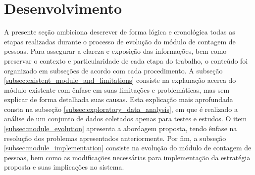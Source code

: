 \section{Desenvolvimento}
\label{sec:metodologia}

A presente seção ambiciona descrever de forma lógica e cronológica todas as etapas realizadas durante o processo de evolução do módulo de contagem de pessoas. Para assegurar a clareza e exposição das informações, bem como preservar o contexto e particularidade de cada etapa do trabalho, o conteúdo foi organizado em subseções de acordo com cada procedimento. A subseção \ref{subsec:existent_module_and_limitations} consiste na explanação acerca do módulo existente com ênfase em suas limitações e problemáticas, mas sem explicar de forma detalhada suas causas. Esta explicação mais aprofundada consta na subseção \ref{subsec:exploratory_data_analysis}, em que é realizado a análise de um conjunto de dados coletados apenas para testes e estudos. O item \ref{subsec:module_evolution} apresenta a abordagem proposta, tendo ênfase na resolução dos problemas apresentados anteriormente. Por fim, a subseção \ref{subsec:module_implementation} consiste na evolução do módulo de contagem de pessoas, bem como as modificações necessárias para implementação da estratégia proposta e suas implicações no sistema.









